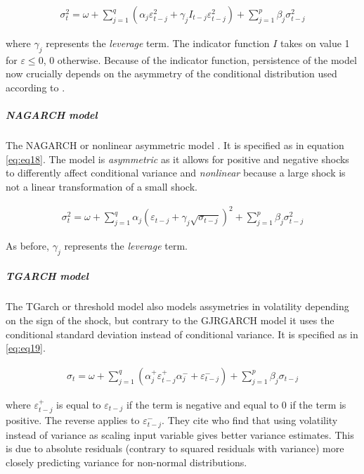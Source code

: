 \documentclass[a4paper, twoside]{templates/ociamthesis}
\begin{document}
\begin{align}
\sigma_t^2 = \omega + \sum\limits_{j=1}^q (\alpha_j \varepsilon_{t-j}^2 + \gamma_j I_{t-j} \varepsilon_{t-j}^2) + \sum\limits_{j = 1}^p \beta_j \sigma_{t-j}^2
 \label{eq:eq17}
\end{align}

\noindent where \(\gamma_j\) represents the \emph{leverage} term. The indicator function \(I\) takes on value 1 for \(\varepsilon \le 0\), 0 otherwise. Because of the indicator function, persistence of the model now crucially depends on the asymmetry of the conditional distribution used according to \textcite{ghalanos2020}.

\hypertarget{nagarch-model}{%
\subparagraph{NAGARCH model}\label{nagarch-model}}

\noindent The NAGARCH or nonlinear asymmetric model \autocite{engle1993}. It is specified as in equation \eqref{eq:eq18}. The model is \emph{asymmetric} as it allows for positive and negative shocks to differently affect conditional variance and \emph{nonlinear} because a large shock is not a linear transformation of a small shock.

\begin{align}
\sigma_t^2 = \omega + \sum\limits_{j=1}^q \alpha_j (\varepsilon_{t-j}+ \gamma_j \sqrt{\sigma_{t-j}})^2 + \sum\limits_{j = 1}^p \beta_j \sigma_{t-j}^2
 \label{eq:eq18}
\end{align}

As before, \(\gamma_j\) represents the \emph{leverage} term.

\hypertarget{tgarch-model}{%
\subparagraph{TGARCH model}\label{tgarch-model}}

\noindent The TGarch or threshold model \autocite{zakoian1994} also models assymetries in volatility depending on the sign of the shock, but contrary to the GJRGARCH model it uses the conditional standard deviation instead of conditional variance. It is specified as in \eqref{eq:eq19}.

\begin{align}
\sigma_t = \omega + \sum\limits_{j=1}^q (\alpha_j^+ \varepsilon_{t-j}^+ \alpha_j^{-} + \varepsilon_{t-j}^{-}) + \sum\limits_{j = 1}^p \beta_j \sigma_{t-j}
 \label{eq:eq19}
\end{align}

\noindent where \(\varepsilon_{t-j}^+\) is equal to \(\varepsilon_{t-j}\) if the term is negative and equal to 0 if the term is positive. The reverse applies to \(\varepsilon_{t-j}^-\). They cite \textcite{davidian1987} who find that using volatility instead of variance as scaling input variable gives better variance estimates. This is due to absolute residuals (contrary to squared residuals with variance) more closely predicting variance for non-normal distributions.
\end{document}

